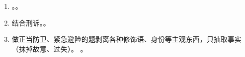 \begin{enumerate}
\begin{enumerate}
\begin{enumerate}
\begin{kk}{偶然防卫}
                        \end{kk}
                        \begin{kk}{相互斗殴}
                          \begin{enumerate}
                            \item 先动手是不法侵害，。
                            \item 无法查明 \yjt 同时动手 \yjt 相互斗殴。
                          \end{enumerate}
                        \end{kk}
                  \item 防卫挑拨。恶意利用正当防卫。
                \end{enumerate}
          \item 对象条件。对不法侵害本人施加（）。。
                \begin{enumerate}
                  \item 共同犯罪。对正犯可以，帮助犯看是否有攻击性。
                \end{enumerate}
          \item 限度条件。防卫手段过当问题。客观必须发生过当结果，主观至少要有过失。
                \begin{enumerate}
                  \item 必要性优先说。。。
                  \item 相当性优先说。比例原则。
                        \begin{enumerate}
                          \item {}。
                          \item {}。
                        \end{enumerate}
                  \item vs 事后防卫。防卫过当前提是正当防卫成立。
                        。
                \end{enumerate}
        \end{enumerate}
  \item {}。。
  \item 结合刑诉。。
  \item 做正当防卫、紧急避险的题剥离各种修饰语、身份等主观东西，只抽取事实（抹掉故意、过失）。
        。
\end{enumerate}
